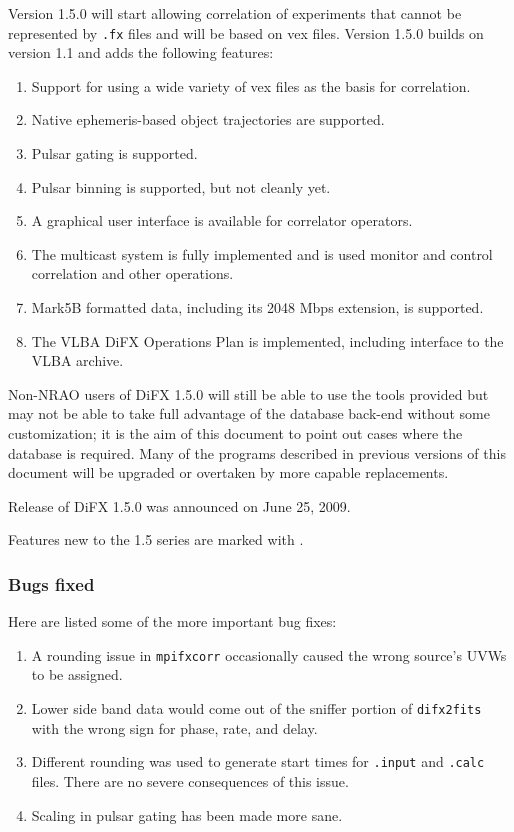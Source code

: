 Version 1.5.0 will start allowing correlation of experiments that cannot be represented by {\tt .fx} files and will be based on vex files.
Version 1.5.0 builds on version 1.1 and adds the following features:
\begin{enumerate}
\item Support for using a wide variety of vex files as the basis for correlation.
\item Native ephemeris-based object trajectories are supported.
\item Pulsar gating is supported.
\item Pulsar binning is supported, but not cleanly yet.
\item A graphical user interface is available for correlator operators.
\item The multicast system is fully implemented and is used monitor and control correlation and other operations.
\item Mark5B formatted data, including its 2048 Mbps extension, is supported.
\item The VLBA DiFX Operations Plan \cite{opsplan} is implemented, including interface to the VLBA archive.
\end{enumerate}
Non-NRAO users of DiFX 1.5.0 will still be able to use the tools provided but may not be able to take full advantage of the database back-end without some customization; it is the aim of this document to point out cases where the database is required.
Many of the programs described in previous versions of this document will be upgraded or overtaken by more capable replacements.

Release of DiFX 1.5.0 was announced on June 25, 2009.

Features new to the 1.5 series are marked with \difxonefive.

\subsubsection{Bugs fixed}

Here are listed some of the more important bug fixes:
\begin{enumerate}
\item A rounding issue in {\tt mpifxcorr} occasionally caused the wrong source's UVWs to be assigned.
\item Lower side band data would come out of the sniffer portion of {\tt difx2fits} with the wrong sign for phase, rate, and delay.
\item Different rounding was used to generate start times for {\tt .input} and {\tt .calc} files.
There are no severe consequences of this issue.
\item Scaling in pulsar gating has been made more sane.
\end{enumerate}

